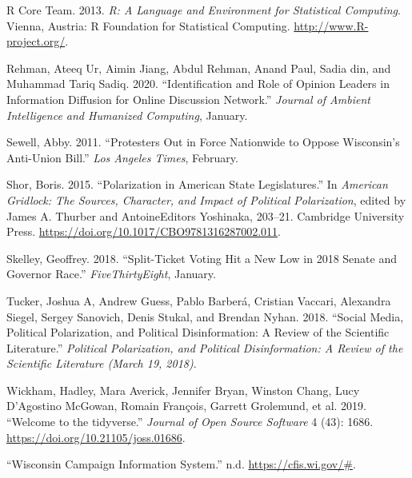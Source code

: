 \documentclass[12pt,]{article}
\begin{document}
\leavevmode\hypertarget{ref-r}{}%
R Core Team. 2013. \emph{R: A Language and Environment for Statistical
Computing}. Vienna, Austria: R Foundation for Statistical Computing.
\url{http://www.R-project.org/}.

\leavevmode\hypertarget{ref-rehman2020}{}%
Rehman, Ateeq Ur, Aimin Jiang, Abdul Rehman, Anand Paul, Sadia din, and
Muhammad Tariq Sadiq. 2020. ``Identification and Role of Opinion Leaders
in Information Diffusion for Online Discussion Network.'' \emph{Journal
of Ambient Intelligence and Humanized Computing}, January.

\leavevmode\hypertarget{ref-sewell2011}{}%
Sewell, Abby. 2011. ``Protesters Out in Force Nationwide to Oppose
Wisconsin's Anti-Union Bill.'' \emph{Los Angeles Times}, February.

\leavevmode\hypertarget{ref-shor2015}{}%
Shor, Boris. 2015. ``Polarization in American State Legislatures.'' In
\emph{American Gridlock: The Sources, Character, and Impact of Political
Polarization}, edited by James A. Thurber and AntoineEditors Yoshinaka,
203--21. Cambridge University Press.
\url{https://doi.org/10.1017/CBO9781316287002.011}.

\leavevmode\hypertarget{ref-skelley2018}{}%
Skelley, Geoffrey. 2018. ``Split-Ticket Voting Hit a New Low in 2018
Senate and Governor Race.'' \emph{FiveThirtyEight}, January.

\leavevmode\hypertarget{ref-tucker2018}{}%
Tucker, Joshua A, Andrew Guess, Pablo Barberá, Cristian Vaccari,
Alexandra Siegel, Sergey Sanovich, Denis Stukal, and Brendan Nyhan.
2018. ``Social Media, Political Polarization, and Political
Disinformation: A Review of the Scientific Literature.'' \emph{Political
Polarization, and Political Disinformation: A Review of the Scientific
Literature (March 19, 2018)}.

\leavevmode\hypertarget{ref-tidyverse}{}%
Wickham, Hadley, Mara Averick, Jennifer Bryan, Winston Chang, Lucy
D'Agostino McGowan, Romain François, Garrett Grolemund, et al. 2019.
``Welcome to the tidyverse.'' \emph{Journal of Open Source Software} 4
(43): 1686. \url{https://doi.org/10.21105/joss.01686}.

\leavevmode\hypertarget{ref-cfis}{}%
``Wisconsin Campaign Information System.'' n.d.
\url{https://cfis.wi.gov/\#}.





\newpage
\singlespacing 
\end{document}
